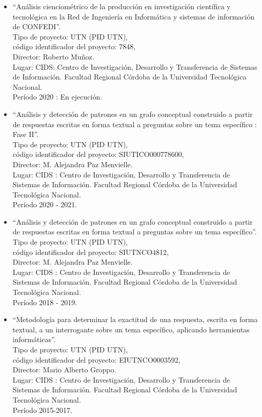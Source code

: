 \documentclass[
	11pt,oneside,a4paper,
	headsepline,footsepline,
	fleqn,
]{memoir}
\begin{document}
\begin{itemize}
	\item “Análisis cienciométrico de la producción en investigación científica y tecnológica en la Red de Ingeniería en Informática y sistemas de información de CONFEDI”. \\
	      Tipo de proyecto: UTN (PID UTN), \\
	      código identificador del proyecto: 7848, \\
	      Director: Roberto Muñoz. \\
	      Lugar: CIDS: Centro de Investigación, Desarrollo y Transferencia de Sistemas de Información. Facultad Regional Córdoba de la Universidad Tecnológica Nacional. \\
	      Período 2020 : En ejecución.
	\item “Análisis y detección de patrones en un grafo conceptual construido a partir de respuestas escritas en forma textual a preguntas sobre un tema específico : Fase II”. \\
	      Tipo de proyecto: UTN (PID UTN), \\
	      código identificador del proyecto: SIUTICO000778600, \\
	      Director: M. Alejandra Paz Menvielle. \\
	      Lugar: CIDS : Centro de Investigación, Desarrollo y Transferencia de Sistemas de Información. Facultad Regional Córdoba de la Universidad Tecnológica Nacional. \\
	      Período 2020 - 2021.
	\item “Análisis y detección de patrones en un grafo conceptual construido a partir de respuestas escritas en forma textual a preguntas sobre un tema específico”. \\
	      Tipo de proyecto: UTN (PID UTN), \\
	      código identificador del proyecto: SIUTNCO4812, \\
	      Director: M. Alejandra Paz Menvielle. \\
	      Lugar: CIDS : Centro de Investigación, Desarrollo y Transferencia de Sistemas de Información. Facultad Regional Córdoba de la Universidad Tecnológica Nacional. \\
	      Período 2018 - 2019.
	\item “Metodología para determinar la exactitud de una respuesta, escrita en forma textual, a un interrogante sobre un tema específico, aplicando herramientas informáticas”. \\
	      Tipo de proyecto: UTN (PID UTN), \\
	      código identificador del proyecto: EIUTNCO0003592, \\
	      Director: Mario Alberto Groppo. \\
	      Lugar: CIDS : Centro de Investigación, Desarrollo y Transferencia de Sistemas de Información. Facultad Regional Córdoba de la Universidad Tecnológica Nacional. \\
	      Período 2015-2017.
\end{itemize}
\end{document}
